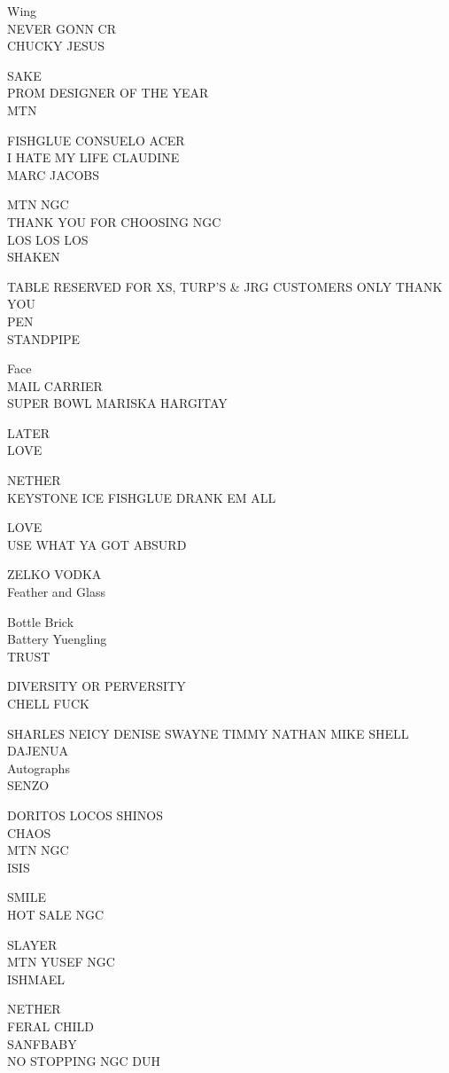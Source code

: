 \documentclass[10pt,letterpaper]{article}
\begin{document}
Wing\\
NEVER GONN CR\\
CHUCKY JESUS

SAKE\\
PROM DESIGNER OF THE YEAR\\
MTN

FISHGLUE CONSUELO ACER\\
I HATE MY LIFE CLAUDINE\\
MARC JACOBS

MTN NGC\\
THANK YOU FOR CHOOSING NGC\\
LOS LOS LOS\\
SHAKEN

TABLE RESERVED FOR XS, TURP'S \& JRG CUSTOMERS ONLY THANK YOU\\
PEN\\
STANDPIPE

Face\\
MAIL CARRIER\\
SUPER BOWL MARISKA HARGITAY

LATER\\
LOVE

NETHER\\
KEYSTONE ICE FISHGLUE DRANK EM ALL

LOVE\\
USE WHAT YA GOT ABSURD

ZELKO VODKA\\
Feather and Glass

Bottle Brick\\
Battery Yuengling\\
TRUST

DIVERSITY OR PERVERSITY\\
CHELL FUCK

SHARLES NEICY DENISE SWAYNE TIMMY NATHAN MIKE SHELL DAJENUA\\
Autographs\\
SENZO

DORITOS LOCOS SHINOS\\
CHAOS\\
MTN NGC\\
ISIS

SMILE\\
HOT SALE NGC

SLAYER\\
MTN YUSEF NGC\\
ISHMAEL

NETHER\\
FERAL CHILD\\
SANFBABY\\
NO STOPPING NGC DUH
\end{document}

